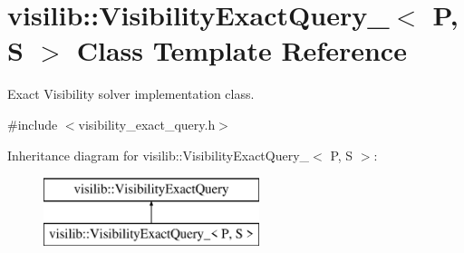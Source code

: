 \hypertarget{classvisilib_1_1_visibility_exact_query__}{}\section{visilib\+::Visibility\+Exact\+Query\+\_\+$<$ P, S $>$ Class Template Reference}
\label{classvisilib_1_1_visibility_exact_query__}


Exact Visibility solver implementation class. 




{\ttfamily \#include $<$visibility\+\_\+exact\+\_\+query.\+h$>$}

Inheritance diagram for visilib\+::Visibility\+Exact\+Query\+\_\+$<$ P, S $>$\+:\begin{figure}[H]
\begin{center}
\leavevmode
\includegraphics[height=2.000000cm]{classvisilib_1_1_visibility_exact_query__}
\end{center}
\end{figure}
